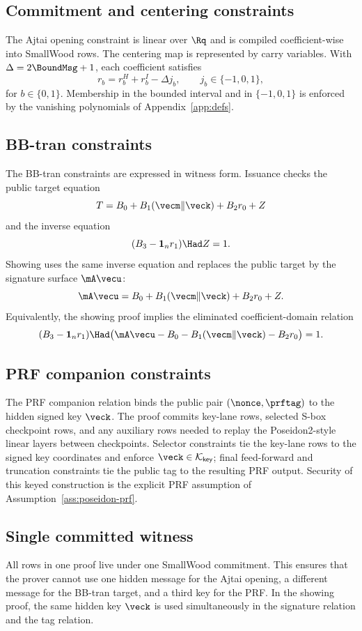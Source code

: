 \subsection{Commitment and centering constraints}
The Ajtai opening constraint is linear over $\Rq$ and is compiled coefficient-wise into SmallWood rows.  The centering
map is represented by carry variables.  With $\Delta=2\BoundMsg+1$, each coefficient satisfies
\[
  r_b = r_b^H+r_b^I-\Delta j_b,
  \qquad j_b\in\{-1,0,1\},
\]
for $b\in\{0,1\}$.  Membership in the bounded interval and in $\{-1,0,1\}$ is enforced by the vanishing
polynomials of Appendix~\ref{app:defs}.

\subsection{BB-tran constraints}
The BB-tran constraints are expressed in witness form.  Issuance checks the public target equation
\[
  T=B_0+B_1(\vecm\Vert\veck)+B_2r_0+Z
\]
and the inverse equation
\[
  (B_3-\mathbf 1_n r_1)\Had Z=1.
\]
Showing uses the same inverse equation and replaces the public target by the signature surface $\mA\vecu$:
\[
  \mA\vecu=B_0+B_1(\vecm\Vert\veck)+B_2r_0+Z.
\]
Equivalently, the showing proof implies the eliminated coefficient-domain relation
\[
  (B_3-\mathbf 1_n r_1)\Had\bigl(\mA\vecu-B_0-B_1(\vecm\Vert\veck)-B_2r_0\bigr)=1.
\]

\subsection{PRF companion constraints}
The PRF companion relation binds the public pair $(\nonce,\prftag)$ to the hidden signed key $\veck$.  The proof
commits key-lane rows, selected S-box checkpoint rows, and any auxiliary rows needed to replay the Poseidon2-style
linear layers between checkpoints.  Selector constraints tie the key-lane rows to the signed key coordinates and
enforce $\veck\in\mathcal K_{\mathsf{key}}$; final feed-forward and truncation constraints tie the public tag to
the resulting PRF output.  Security of this keyed construction is the explicit PRF assumption of
Assumption~\ref{ass:poseidon-prf}.

\subsection{Single committed witness}
All rows in one proof live under one SmallWood commitment.  This ensures that the prover cannot use one hidden
message for the Ajtai opening, a different message for the BB-tran target, and a third key for the PRF.  In the showing
proof, the same hidden key $\veck$ is used simultaneously in the signature relation and the tag relation.
